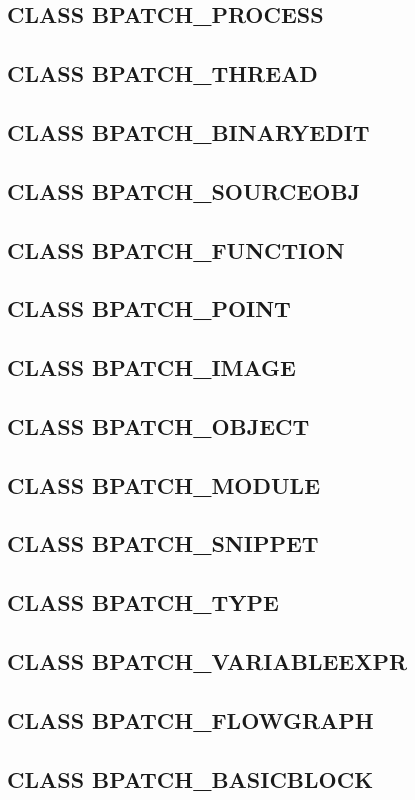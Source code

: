 \subsection{CLASS BPATCH\_PROCESS}
\subsection{CLASS BPATCH\_THREAD}
\subsection{CLASS BPATCH\_BINARYEDIT}
\subsection{CLASS BPATCH\_SOURCEOBJ}
\subsection{CLASS BPATCH\_FUNCTION}
\subsection{CLASS BPATCH\_POINT}
\subsection{CLASS BPATCH\_IMAGE}
\subsection{CLASS BPATCH\_OBJECT}
\subsection{CLASS BPATCH\_MODULE}
\subsection{CLASS BPATCH\_SNIPPET}
\subsection{CLASS BPATCH\_TYPE}
\subsection{CLASS BPATCH\_VARIABLEEXPR}
\subsection{CLASS BPATCH\_FLOWGRAPH}
\subsection{CLASS BPATCH\_BASICBLOCK}
